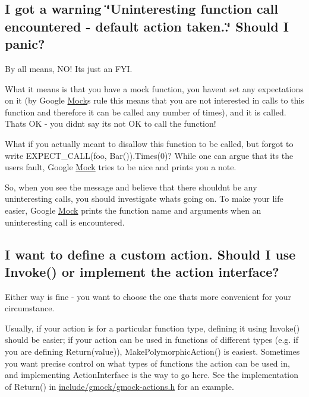 \subsection*{I got a warning \char`\"{}\+Uninteresting function call encountered -\/ default action taken..\char`\"{} Should I panic?}

By all means, N\+O! It\textquotesingle{}s just an F\+YI.

What it means is that you have a mock function, you haven\textquotesingle{}t set any expectations on it (by Google \mbox{\hyperlink{class_mock}{Mock}}\textquotesingle{}s rule this means that you are not interested in calls to this function and therefore it can be called any number of times), and it is called. That\textquotesingle{}s OK -\/ you didn\textquotesingle{}t say it\textquotesingle{}s not OK to call the function!

What if you actually meant to disallow this function to be called, but forgot to write {\ttfamily E\+X\+P\+E\+C\+T\+\_\+\+C\+A\+L\+L(foo, Bar()).Times(0)}? While one can argue that it\textquotesingle{}s the user\textquotesingle{}s fault, Google \mbox{\hyperlink{class_mock}{Mock}} tries to be nice and prints you a note.

So, when you see the message and believe that there shouldn\textquotesingle{}t be any uninteresting calls, you should investigate what\textquotesingle{}s going on. To make your life easier, Google \mbox{\hyperlink{class_mock}{Mock}} prints the function name and arguments when an uninteresting call is encountered.

\subsection*{I want to define a custom action. Should I use Invoke() or implement the action interface?}

Either way is fine -\/ you want to choose the one that\textquotesingle{}s more convenient for your circumstance.

Usually, if your action is for a particular function type, defining it using {\ttfamily Invoke()} should be easier; if your action can be used in functions of different types (e.\+g. if you are defining {\ttfamily Return(value)}), {\ttfamily Make\+Polymorphic\+Action()} is easiest. Sometimes you want precise control on what types of functions the action can be used in, and implementing {\ttfamily Action\+Interface} is the way to go here. See the implementation of {\ttfamily Return()} in {\ttfamily \mbox{\hyperlink{gmock-actions_8h_source}{include/gmock/gmock-\/actions.\+h}}} for an example.

